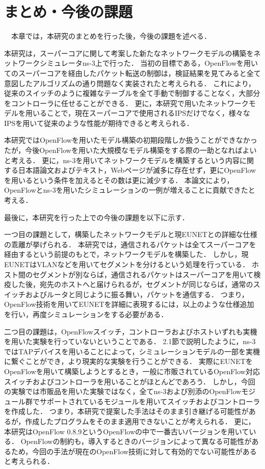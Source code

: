 \chapter{まとめ・今後の課題}

　本章では，本研究のまとめを行った後，今後の課題を述べる．

本研究は，スーパーコアに関して考案した新たなネットワークモデルの構築をネットワークシミュレータns-3上で行った．
当初の目標である，OpenFlowを用いてのスーパーコアを経由したパケット転送の制御は，検証結果を見てみると全て意図したアルゴリズムの通り問題なく実装されたと考えられる．
これにより，従来のスイッチのように複雑なテーブルを全て手動で制御することなく，大部分をコントローラに任せることができる．
更に，本研究で用いたネットワークモデルを用いることで，現在スーパーコアで使用されるIPSだけでなく，様々なIPSを用いて従来のような性能が期待できると考えられる．

本研究ではOpenFlowを用いたモデル構築の初期段階しか扱うことができなかったが，今後OpenFlowを用いた大規模なモデル構築をする際の一助となればよいと考える．
更に，ns-3を用いてネットワークモデルを構築するという内容に関する日本語論文およびテキスト，Webページが滅多に存在せず，更にOpenFlowを用いるという条件を加えるとその数は更に減少する．
本論文により，OpenFlowとns-3を用いたシミュレーションの一例が増えることに貢献できたと考える．

最後に，本研究を行った上での今後の課題を以下に示す．

一つ目の課題として，構築したネットワークモデルと現EUNETとの詳細な仕様の乖離が挙げられる．
本研究では，通信されるパケットは全てスーパーコアを経由するという前提のもとで，ネットワークモデルを構築した．
しかし，現EUNETはVLANなどを用いてセグメントを分けるという処理を行っている．
ホスト間のセグメントが別ならば，通信されるパケットはスーパーコアを用いて検疫した後，宛先のホストへと届けられるが，セグメントが同じならば，通常のスイッチおよびルータと同じように振る舞い，パケットを通信する．
つまり，OpenFlow技術を用いてEUNETを詳細に表現するには，以上のような仕様追加を行い，再度シミュレーションをする必要がある．

二つ目の課題は，OpenFlowスイッチ，コントローラおよびホストいずれも実機を用いた実験を行っていないということである．
2.1節で説明したように，ns-3ではTAPデバイスを用いることによって，シミュレーションモデルの一部を実機に繋ぐことができ，より現実的な実験を行うことができる．
実際にEUNETをOpenFlowを用いて構築しようとするとき，一般に市販されているOpenFlow対応スイッチおよびコントローラを用いることがほとんどであろう．
しかし，今回の実験では市販品を用いた実験ではなく，全てns-3および別添のOpenFlowモジュール群でサポートされているモジュールを用いてスイッチおよびコントローラを作成した．
つまり，本研究で提案した手法はそのまま引き継げる可能性があるが，作成したプログラムをそのまま適用できないことが考えられる．
更に，本研究はOpenFlow 0.8.9というOpenFlowの中で一番古いバージョンを用いている．
OpenFlowの制約も，導入するときのバージョンによって異なる可能性があるため，今回の手法が現在のOpenFlow技術に対して有効的でない可能性があると考えられる．